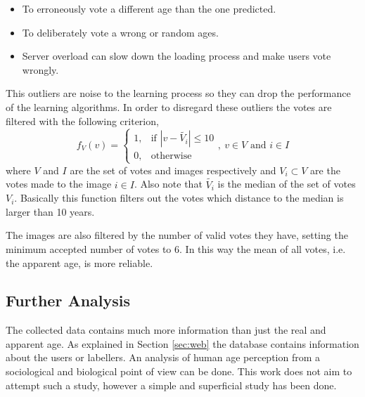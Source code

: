 \begin{itemize}
	\item To erroneously vote a different age than the one predicted.
	\item To deliberately vote a wrong or random ages.
	\item Server overload can slow down the loading process and make users vote wrongly.
\end{itemize}

This outliers are noise to the learning process so they can drop the performance of the learning algorithms. In order to disregard these outliers the votes are filtered with the following criterion,
\begin{equation}
f_V(v) = 
\begin{cases}
1,				& \text{if } |v - \tilde{V_i}| \leq 10\\
0,              & \text{otherwise}
\end{cases}
,\ v\in V \text{ and } i\in I
\end{equation}
where $V$ and $I$ are the set of votes and images respectively and $V_i \subset V$ are the votes made to the image $i\in I$. Also note that $\tilde{V_i}$ is the median of the set of votes $V_i$. Basically this function filters out the votes which distance to the median is larger than 10 years.

The images are also filtered by the number of valid votes they have, setting the minimum accepted number of votes to 6. In this way the mean of all votes, i.e. the apparent age, is more reliable.

\subsection{Further Analysis}

The collected data contains much more information than just the real and apparent age. As explained in Section \ref{sec:web} the database contains information about the users or labellers. An analysis of human age perception from a sociological and biological point of view can be done. This work does not aim to attempt such a study, however a simple and superficial study has been done. 

